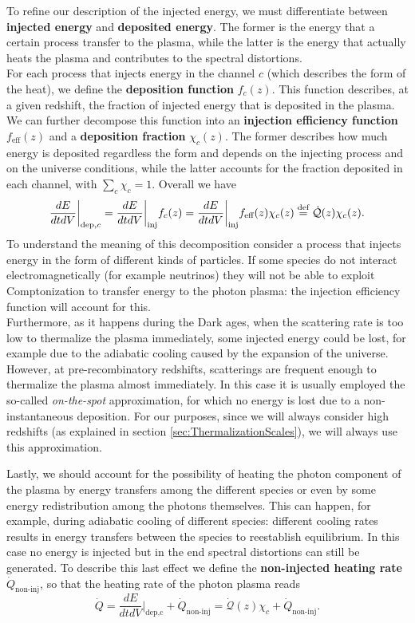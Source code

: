 To refine our description of the injected energy, we must differentiate between \textbf{injected energy} and \textbf{deposited energy}. The former is the energy that a certain process transfer to the plasma, while the latter is the energy that actually heats the plasma and contributes to the spectral distortions.\\ For each process that injects energy in the channel $c$ (which describes the form of the heat), we define the \textbf{deposition function} $f_c(z)$. This function describes, at a given redshift, the fraction of injected energy that is deposited in the plasma. We can further decompose this function into an \textbf{injection efficiency function } $f_{\text{eff}}(z)$ and a \textbf{deposition fraction} $\chi_{c}(z)$. The former describes how much energy is deposited regardless the form and depends on the injecting process and on the universe conditions, while the latter accounts for the fraction deposited in each channel, with $\sum_c\chi_c=1$. Overall we have
\begin{equation}\label{eq:deposition_function}
    \frac{dE}{dt dV}\bigg|_{\text{dep},c}=\frac{dE}{dt dV}\bigg|_{\text{inj}}f_c(z)=\frac{dE}{dt dV}\bigg|_{\text{inj}}f_{\text{eff}}(z)\chi_c(z)\stackrel{\text{def}}{=} \dot{\mathcal{Q}}(z)\chi_c(z).
\end{equation}
To understand the meaning of this decomposition consider a process that injects energy in the form of different kinds of particles. If some species do not interact electromagnetically (for example neutrinos) they will not be able to exploit Comptonization to transfer energy to the photon plasma: the injection efficiency function will account for this.\\
Furthermore, as it happens during the Dark ages, when the scattering rate is too low to thermalize the plasma immediately, some injected energy could be lost, for example due to the adiabatic cooling caused by the expansion of the universe. However, at pre-recombinatory redshifts, scatterings are frequent enough to thermalize the plasma almost immediately. In this case it is usually employed the so-called \emph{on-the-spot} approximation, for which no energy is lost due to a non-instantaneous deposition. For our purposes, since we will always consider high redshifts (as explained in section \ref{sec:ThermalizationScales}), we will always use this approximation.

Lastly, we should account for the possibility of heating the photon component of the plasma by energy transfers among the different species or even by some energy redistribution among the photons themselves. This can happen, for example, during adiabatic cooling of different species: different cooling rates results in energy transfers between the species to reestablish equilibrium.   In this case no energy is injected but in the end spectral distortions can still be generated. To describe this last effect we define the \textbf{non-injected heating rate} $\dot{Q}_\text{non-inj}$, so that the heating rate of the photon plasma reads
\begin{equation}
    \dot{Q}=\frac{dE}{dtdV}\bigg|_{\text{dep,c}}+\dot{Q}_\text{non-inj}=\dot{\mathcal{Q}}(z)\chi_c+\dot{Q}_\text{non-inj}.\label{eq:heating_rate}
\end{equation}

